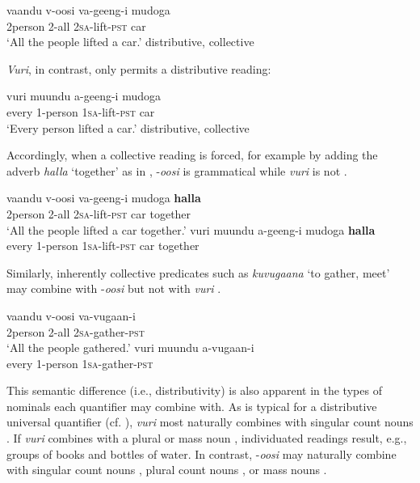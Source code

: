 \documentclass[output=paper]{langsci/langscibook}
\begin{document}
\ea\label{ex:landman:3}
\gll vaandu  v-oosi    va-geeng-i    mudoga\\
     2person  2-all    2\textsc{sa}-lift-\textsc{pst}    car\\
\glt ‘All the people lifted a car.’  {\checkmark}distributive, {\checkmark}collective
\z

\textit{Vuri}, in contrast, only permits a distributive reading:

\ea\label{ex:landman:4}
\gll vuri  muundu  a-geeng-i    mudoga\\
     every  1-person  1\textsc{sa}-lift-\textsc{pst}    car\\
\glt ‘Every person lifted a car.’  {\checkmark}distributive, {\texttimes}collective
\z

Accordingly, when a collective reading is forced, for example by adding the adverb \textit{halla} ‘together’ as in , -\textit{oosi} is grammatical  while \textit{vuri} is not .    

\ea\label{ex:landman:5} 
\ea\label{ex:landman:5a} 
\gll vaandu    v-oosi  va-geeng-i    mudoga  \textbf{halla}\\
     2person  2-all  2\textsc{sa}-lift-\textsc{pst}  car    together\\
\glt ‘All the people lifted a car together.’
\ex\label{ex:landman:5b}
\gll *vuri  muundu  a-geeng-i  mudoga  \textbf{halla}\\
     every  1-person  1\textsc{sa}-lift-\textsc{pst}  car    together\\
\z
\z

Similarly, inherently collective predicates such as \textit{kuvugaana} ‘to gather, meet’ may combine with -\textit{oosi}  but not with \textit{vuri} .

\ea\label{ex:landman:6}
\ea\label{ex:landman:6a}
\gll vaandu  v-oosi    va-vugaan-i\\
     2person  2-all    2\textsc{sa}-gather-\textsc{pst}  \\
\glt ‘All the people gathered.’
\ex\label{ex:landman:6b}
\gll *vuri  muundu  a-vugaan-i  \\
     every  1-person  1\textsc{sa}-gather-\textsc{pst}  \\
\z
\z

This semantic difference (i.e., distributivity) is also apparent in the types of nominals each quantifier may combine with. As is typical for a distributive universal quantifier (cf. \citealt{Gil1995}), \textit{vuri} most naturally combines with singular count nouns . If \textit{vuri} combines with a plural  or mass noun , individuated readings result, e.g., groups of books and bottles of water. In contrast, -\textit{oosi} may naturally combine with singular count nouns , plural count nouns , or mass nouns .
\end{document}
